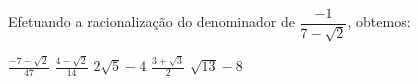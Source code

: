 Efetuando a racionalização do denominador de $\dfrac{-1}{7-\sqrt{2}}$, obtemos:

$\frac{-7-\sqrt{2}}{47}$
$\frac{4-\sqrt{2}}{14}$
$2\sqrt{5}-4$
$\frac{3+\sqrt{3}}{2}$
$\sqrt{13}-8$

